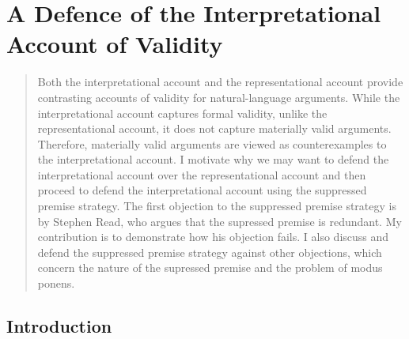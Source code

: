 
\chapter{A Defence of the Interpretational Account of Validity}

\begin{quote}
Both the interpretational account and the representational account
provide contrasting accounts of validity for natural-language arguments.
While the interpretational account captures formal validity, unlike the
representational account, it does not capture materially valid
arguments. Therefore, materially valid arguments are viewed as
counterexamples to the interpretational account. I motivate why we may
want to defend the interpretational account over the representational
account and then proceed to defend the interpretational account using
the suppressed premise strategy. The first objection to the suppressed
premise strategy is by Stephen Read, who argues that the supressed
premise is redundant. My contribution is to demonstrate how his
objection fails. I also discuss and defend the suppressed premise
strategy against other objections, which concern the nature of the
supressed premise and the problem of modus ponens.
\end{quote}

\vspace{\credgap}

\section*{Introduction}


